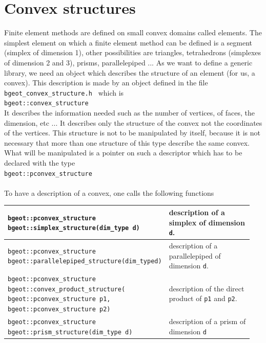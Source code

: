 \documentclass[11pt,a4paper]{article}
\begin{document}
\newpage
\tableofcontents
\newpage


\section{Convex structures}
Finite element methods are defined on small convex domains called elements. The simplest element on which a finite element method can be defined is a segment (simplex of dimension 1), other possibilities are triangles, tetrahedrons (simplexes of dimension 2 and 3), prisms, parallelepiped ...
As we want to define a generic library, we need an object which describes the structure of an element (for us, a convex). This description is made by an object defined in the file {\tt bgeot\_convex\_structure.h } which is\\[0.5cm]
{\tt bgeot::convex\_structure }\\[0.5cm]
It describes the information needed such as the number of vertices, of faces, the dimension, etc ... It describes only the structure of the convex not the coordinates of the vertices.
This structure is not to be manipulated by itself, because it is not necessary that more than one structure of this type describe the same convex. What will be manipulated is a pointer on such a  descriptor which has to be declared with the type\\[0.5cm]
{ \tt bgeot::pconvex\_structure } \\ \\

To have a description of a convex, one calls the following functions

\begin{center} \begin{tabular}{|m{0.55\linewidth}|m{0.4\linewidth}|} \hline
  {\tt bgeot::pconvex\_structure bgeot::simplex\_structure(dim\_type d)} & description of a simplex of dimension {\tt d}. \\ \hline
  {\tt bgeot::pconvex\_structure bgeot::parallelepiped\_structure(dim\_type\;d)} &  description of a parallelepiped of dimension {\tt d}. \\ \hline
  {\tt bgeot::pconvex\_structure bgeot::convex\_product\_structure( bgeot::pconvex\_structure p1, bgeot::pconvex\_structure p2) } & description of the direct product of {\tt p1} and {\tt p2}.\\ \hline
  {\tt bgeot::pconvex\_structure bgeot::prism\_structure(dim\_type d)}  & description of a prism of dimension {\tt d}\\ \hline
\end{tabular} \end{center}
\end{document}
